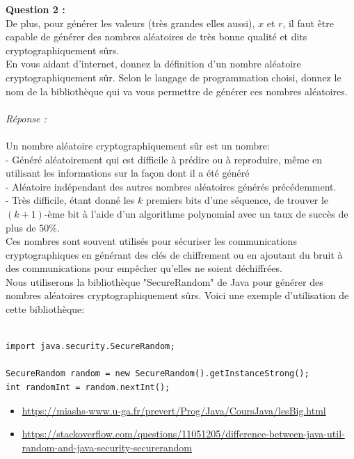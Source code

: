 \documentclass[a4paper,11pt]{article}
\begin{document}
        \label{subsec:Q2}
        \textbf{Question 2 : \\}De plus, pour générer les valeurs (très grandes elles aussi), $x$ et $r$, il faut être capable de générer des nombres aléatoires de très bonne qualité et dits cryptographiquement sûrs.\\En vous aidant d’internet, donnez la définition d’un nombre aléatoire cryptographiquement sûr. Selon le langage de programmation choisi, donnez le nom de la bibliothèque qui va vous permettre de générer ces nombres aléatoires.\\ \textit{\\Réponse :}\\\\Un nombre aléatoire cryptographiquement sûr est un nombre:\\ - Généré aléatoirement qui est difficile à prédire ou à reproduire, même en utilisant les informations sur la façon dont il a été généré\\ - Aléatoire indépendant des autres nombres aléatoires générés précédemment.\\ - Très difficile, étant donné les $k$ premiers bits d'une séquence, de trouver le $(k+1)$-ème bit à l'aide d'un algorithme polynomial avec un taux de succès de plus de 50\%.\\ Ces nombres sont souvent utilisés pour sécuriser les communications cryptographiques en générant des clés de chiffrement ou en ajoutant du bruit à des communications pour empêcher qu'elles ne soient déchiffrées.\\
        Nous utiliserons la bibliothèque "SecureRandom" de Java pour générer des nombres aléatoires cryptographiquement sûrs. Voici une exemple d'utilisation de cette bibliothèque:\\\\ \begin{lstlisting}
import java.security.SecureRandom;

SecureRandom random = new SecureRandom().getInstanceStrong();
int randomInt = random.nextInt();

        \end{lstlisting}
        \begin{itemize}
                \item \url{https://miashs-www.u-ga.fr/prevert/Prog/Java/CoursJava/lesBig.html}
                \item \url{https://stackoverflow.com/questions/11051205/difference-between-java-util-random-and-java-security-securerandom}
        \end{itemize}
\end{document}
